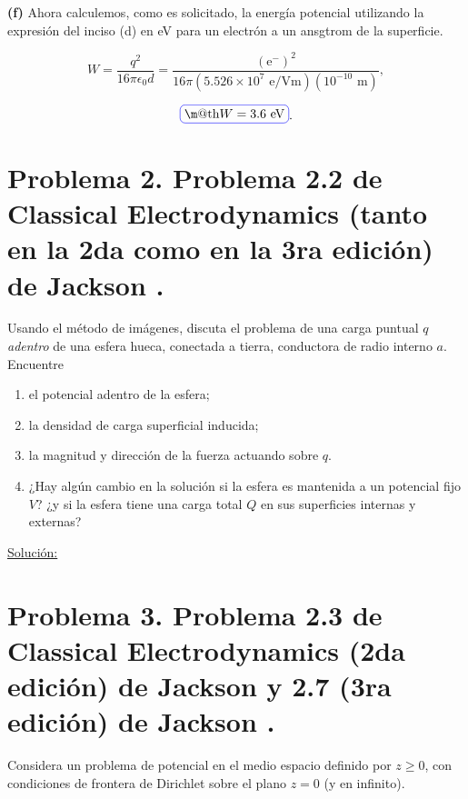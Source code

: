 \documentclass[a4paper,10pt]{article}
\makeatletter
\numberwithin{equation}{section}
\newcommand*{\boxcolor}{blue}
\renewcommand{\boxed}[1]{\textcolor{\boxcolor}{%
\tikz[baseline={([yshift=-1ex]current bounding box.center)}] \node [rectangle, minimum width=1ex,rounded corners,draw] {\normalcolor\m@th$\displaystyle#1$};}}
\makeatother
\begin{document}
\textbf{(f)} Ahora calculemos, como es solicitado, la energía potencial utilizando 
la expresión del inciso (d) en eV para un electrón a un ansgtrom de la superficie.

\begin{equation}
 W = \frac{q^2}{16\pi\epsilon_0d} = \frac{(\text{e}^-)^2}{16\pi(5.526\times 10^7 \text{ e/Vm})
 (10^{-10}\text{ m})},
\end{equation}

\begin{equation}
 \boxed{W = 3.6 \text{ eV}}.
\end{equation}

\section{Problema 2. Problema 2.2 de Classical Electrodynamics (tanto en la 2da 
como en la 3ra edición) de Jackson \cite{jackson2,jackson3}.}

Usando el método de imágenes, discuta el problema de una carga puntual $q$ 
\emph{adentro} de una esfera hueca, conectada a tierra, conductora de radio interno
$a$. Encuentre 

\begin{enumerate}[label=\textbf{(\alph*)}]
 \item el potencial adentro de la esfera;
 \item la densidad de carga superficial inducida;
 \item la magnitud y dirección de la fuerza actuando sobre $q$.
 \item ¿Hay algún cambio en la solución si la esfera es mantenida a un potencial 
 fijo $V$? ¿y si la esfera tiene una carga total $Q$ en sus superficies internas y 
 externas?
\end{enumerate}

\vspace{.3cm}

\underline{Solución:} \vspace{.3cm}

\section{Problema 3. Problema 2.3 de Classical Electrodynamics (2da edición) de Jackson 
\cite{jackson2} y 2.7 (3ra edición) de Jackson \cite{jackson3}.}

Considera un problema de potencial en el medio espacio definido por $z \geq 0$, con 
condiciones de frontera de Dirichlet sobre el plano $z = 0$ (y en infinito).
\end{document}
